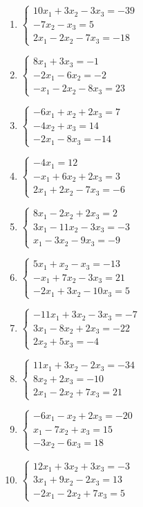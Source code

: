 \begin{enumerate}[label=\arabic*., leftmargin=*]
\item $\begin{cases}10x_1+3x_2-3x_3=-39\\-7x_2-x_3=5\\2x_1-2x_2-7x_3=-18\end{cases}$
\item $\begin{cases}8x_1+3x_3=-1\\-2x_1-6x_2=-2\\-x_1-2x_2-8x_3=23\end{cases}$
\item $\begin{cases}-6x_1+x_2+2x_3=7\\-4x_2+x_3=14\\-2x_1-8x_3=-14\end{cases}$
\item $\begin{cases}-4x_1=12\\-x_1+6x_2+2x_3=3\\2x_1+2x_2-7x_3=-6\end{cases}$
\item $\begin{cases}8x_1-2x_2+2x_3=2\\3x_1-11x_2-3x_3=-3\\x_1-3x_2-9x_3=-9\end{cases}$
\item $\begin{cases}5x_1+x_2-x_3=-13\\-x_1+7x_2-3x_3=21\\-2x_1+3x_2-10x_3=5\end{cases}$
\item $\begin{cases}-11x_1+3x_2-3x_3=-7\\3x_1-8x_2+2x_3=-22\\2x_2+5x_3=-4\end{cases}$
\item $\begin{cases}11x_1+3x_2-2x_3=-34\\8x_2+2x_3=-10\\2x_1-2x_2+7x_3=21\end{cases}$
\item $\begin{cases}-6x_1-x_2+2x_3=-20\\x_1-7x_2+x_3=15\\-3x_2-6x_3=18\end{cases}$
\item $\begin{cases}12x_1+3x_2+3x_3=-3\\3x_1+9x_2-2x_3=13\\-2x_1-2x_2+7x_3=5\end{cases}$

\end{enumerate}
